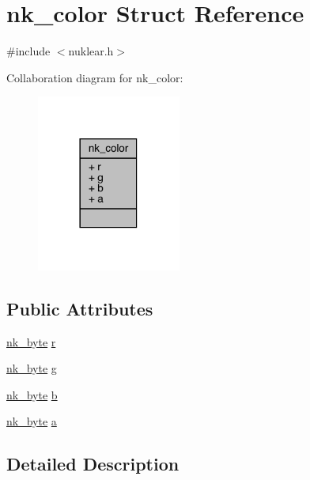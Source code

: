 \hypertarget{structnk__color}{}\section{nk\+\_\+color Struct Reference}
\label{structnk__color}


{\ttfamily \#include $<$nuklear.\+h$>$}



Collaboration diagram for nk\+\_\+color\+:
\nopagebreak
\begin{figure}[H]
\begin{center}
\leavevmode
\includegraphics[width=134pt]{structnk__color__coll__graph}
\end{center}
\end{figure}
\subsection*{Public Attributes}
\begin{DoxyCompactItemize}
\item 
\mbox{\hyperlink{nuklear_8h_a1a0ad76219a407f92601a49b44507ecb}{nk\+\_\+byte}} \mbox{\hyperlink{structnk__color_a8c27a9094c4cc8a24adfd111f1c38812}{r}}
\item 
\mbox{\hyperlink{nuklear_8h_a1a0ad76219a407f92601a49b44507ecb}{nk\+\_\+byte}} \mbox{\hyperlink{structnk__color_a5f9b6e27eec7cc99ab12fa52a31ca6d1}{g}}
\item 
\mbox{\hyperlink{nuklear_8h_a1a0ad76219a407f92601a49b44507ecb}{nk\+\_\+byte}} \mbox{\hyperlink{structnk__color_abce18b5d5e10d175f553cf1b91fee9d4}{b}}
\item 
\mbox{\hyperlink{nuklear_8h_a1a0ad76219a407f92601a49b44507ecb}{nk\+\_\+byte}} \mbox{\hyperlink{structnk__color_a5201902552072c321cb43bb0e821fde8}{a}}
\end{DoxyCompactItemize}


\subsection{Detailed Description}


